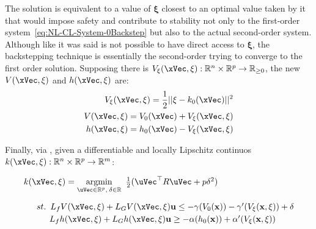 The solution is equivalent to a value of \(\mathbf{\xi}\) closest to an optimal value taken by it that would impose safety and contribute to stability not only to the first-order system~\ref{eq:NL-CL-System-0Backstep} but also to the actual second-order system. Although like it was said is not possible to have direct access to \(\mathbf{\xi}\), the backstepping technique is essentially the second-order trying to converge to the first order solution. Supposing there is \( V_{\mathbf{\xi}}(\xVec, \mathbf{\xi}): \mathbb{R}^n \times \mathbb{R}^p \rightarrow \mathbb{R}_{\geq 0} \), the new  \(V(\xVec, \mathbf{\xi})\) and  \(h(\xVec, \mathbf{\xi})\) are:
\begin{subequations}
    \label{eq:Backstepp_CF}
    \begin{align}
        V_{\mathbf{\xi}}(\xVec, \mathbf{\xi}) = \frac{1}{2}|| \mathbf{\xi} -  k_0(\xVec) ||^2 
        \label{eq:Backstepp_prejudice}\\
        V(\xVec, \mathbf{\xi}) = V_0(\xVec) + V_{\mathbf{\xi}}(\xVec, \mathbf{\xi}) 
        \label{eq:Backstepp_V}\\
        h(\xVec, \mathbf{\xi}) = h_0(\xVec) - V_{\mathbf{\xi}}(\xVec, \mathbf{\xi})
        \label{eq:Backstepp_h}
    \end{align}
\end{subequations}


Finally, via , given a differentiable and locally Lipschitz continuos \(k(\xVec, \mathbf{\xi}):\mathbb{R}^n \times \mathbb{R}^p \to \mathbb{R}^m\):

\begin{equation}
    \begin{array}{l}
        k(\xVec, \mathbf{\xi}) = \underset{\uVec \in \mathbb{R}^p, \hspace{0.2em} \delta \in \mathbb{R}}{\mathrm{argmin}} \quad \hspace{-0.5em} \frac{1}{2} (\uVec^\top R \uVec + p\delta^2 ) \vspace{1em} \\ 
        \quad \hspace{0.5em}  st. \hspace{0.5em} L_fV(\xVec, \mathbf{\xi}) + L_GV(\xVec, \mathbf{\xi})\mathbf{u} \leq -\gamma(V_0(\mathbf{x})) -\gamma'(V_{\mathbf{\xi}}(\mathbf{x}, \mathbf{\xi})) + \delta \vspace{0.25em}\\
        \quad \quad \hspace{1em}                 L_fh(\xVec, \mathbf{\xi}) + L_Gh(\xVec, \mathbf{\xi})\mathbf{u} \geq -\alpha(h_0(\mathbf{x})) + \alpha'(V_{\mathbf{\xi}}(\mathbf{x}, \mathbf{\xi}))
    \end{array}
 \label{eq:CLF-CBF-QP-relaxed-1Backstep}
\end{equation}


